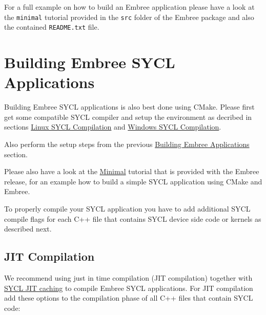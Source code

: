 \begin{Shaded}
\begin{Highlighting}[]
\OperatorTok{(}\OperatorTok{)}
\end{Highlighting}
\end{Shaded}

For a full example on how to build an Embree application please have a
look at the \texttt{minimal} tutorial provided in the \texttt{src}
folder of the Embree package and also the contained \texttt{README.txt}
file.

\section{Building Embree SYCL
Applications}\label{building-embree-sycl-applications}

Building Embree SYCL applications is also best done using CMake. Please
first get some compatible SYCL compiler and setup the environment as
decribed in sections \hyperref[linux-sycl-compilation]{Linux SYCL
Compilation} and \hyperref[windows-sycl-compilation]{Windows SYCL
Compilation}.

Also perform the setup steps from the previous
\hyperref[building-embree-applications]{Building Embree Applications}
section.

Please also have a look at the \hyperref[minimal]{Minimal} tutorial that
is provided with the Embree release, for an example how to build a
simple SYCL application using CMake and Embree.

To properly compile your SYCL application you have to add additional
SYCL compile flags for each C++ file that contains SYCL device side code
or kernels as described next.

\subsection{JIT Compilation}\label{jit-compilation}

We recommend using just in time compilation (JIT compilation) together
with \hyperref[sycl-jit-caching]{SYCL JIT caching} to compile Embree
SYCL applications. For JIT compilation add these options to the
compilation phase of all C++ files that contain SYCL code:

\begin{Shaded}
\begin{Highlighting}[]
\OperatorTok{{-}}\OperatorTok{{-}}\OperatorTok{{-}}\OperatorTok{{-}}\OperatorTok{{-}}\OperatorTok{{-}}\OperatorTok{{-}}\OperatorTok{{-}}\OperatorTok{=}
\end{Highlighting}
\end{Shaded}

